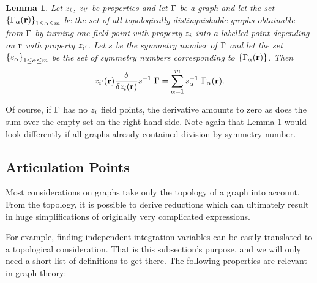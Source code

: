 \documentclass[8.5pt,twoside,twocolumn]{article}
\newcommand\zi{\enmat{z_i}}
\newcommand\zip{\enmat{z_{i'}}}
\renewcommand\r{\bo r}
\theoremstyle{standard}
\newtheorem{lem}[theo]{Lemma}
\begin{document}

\begin{lem}
Let $\zi$, $\zip$ be properties and let $\Gamma$ be a graph and let the set
$\st{\Ga_\al(\r)}_{1\le\al\le m}$ be the set of all topologically
distinguishable graphs obtainable from $\Gamma$ by turning one field point with
property $\zi$ into a labelled point depending on $\r$ with property $\zip$. Let
$s$ be the symmetry number of $\Gamma$ and let the set $\left\{{s_{\alpha}} \right\}_{1\le\alpha\le m}$
be the set of symmetry numbers corresponding to $\st{\Ga_\al(\r)}$. Then
\begin{equation}
\zip(\r)\delti{}{\zi(\r)} s\iv\ \Ga = \sum_{\al=1}^m s_\al\iv\ \Ga_\al(\r).
\end{equation}
\label{funcderi2}
\end{lem}
Of course, if $\Gamma$ has no $\zi$ field points, the derivative amounts to
zero as does the sum over the empty set on the right hand side. Note again that
Lemma \ref{funcderi2} would look differently if all graphs already contained division by symmetry number.

\subsection{Articulation Points}
\label{ArtPoint}

Most considerations on graphs take only the topology of a graph into account. From the
topology, it is possible to derive reductions which can ultimately result in
huge simplifications of originally very complicated expressions.

For example, finding independent integration variables can be easily translated to a topological consideration.
That is this subsection's purpose, and we will only need a short list of definitions
to get there. The following properties are relevant in graph theory:
\end{document}

